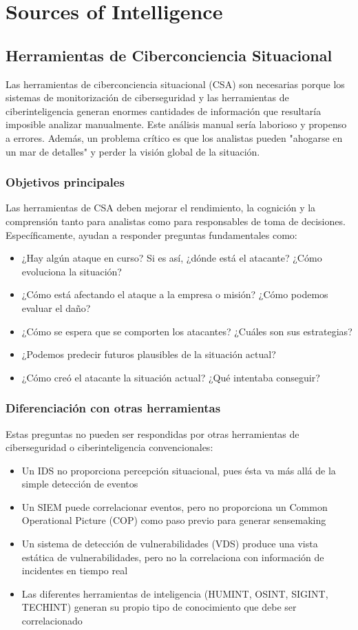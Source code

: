 \chapter{Sources of Intelligence}

\section{Herramientas de Ciberconciencia Situacional}
Las herramientas de ciberconciencia situacional (CSA) son necesarias porque los sistemas de monitorización de ciberseguridad y las herramientas de ciberinteligencia generan enormes cantidades de información que resultaría imposible analizar manualmente. Este análisis manual sería laborioso y propenso a errores. Además, un problema crítico es que los analistas pueden "ahogarse en un mar de detalles" y perder la visión global de la situación.

\subsection{Objetivos principales}
Las herramientas de CSA deben mejorar el rendimiento, la cognición y la comprensión tanto para analistas como para responsables de toma de decisiones. Específicamente, ayudan a responder preguntas fundamentales como:
\begin{itemize}
   \item ¿Hay algún ataque en curso? Si es así, ¿dónde está el atacante? ¿Cómo evoluciona la situación?
   \item ¿Cómo está afectando el ataque a la empresa o misión? ¿Cómo podemos evaluar el daño?
   \item ¿Cómo se espera que se comporten los atacantes? ¿Cuáles son sus estrategias?
   \item ¿Podemos predecir futuros plausibles de la situación actual?
   \item ¿Cómo creó el atacante la situación actual? ¿Qué intentaba conseguir?
\end{itemize}

\subsection{Diferenciación con otras herramientas}
Estas preguntas no pueden ser respondidas por otras herramientas de ciberseguridad o ciberinteligencia convencionales:
\begin{itemize}
   \item Un IDS no proporciona percepción situacional, pues ésta va más allá de la simple detección de eventos
   \item Un SIEM puede correlacionar eventos, pero no proporciona un Common Operational Picture (COP) como paso previo para generar sensemaking
   \item Un sistema de detección de vulnerabilidades (VDS) produce una vista estática de vulnerabilidades, pero no la correlaciona con información de incidentes en tiempo real
   \item Las diferentes herramientas de inteligencia (HUMINT, OSINT, SIGINT, TECHINT) generan su propio tipo de conocimiento que debe ser correlacionado
\end{itemize}

